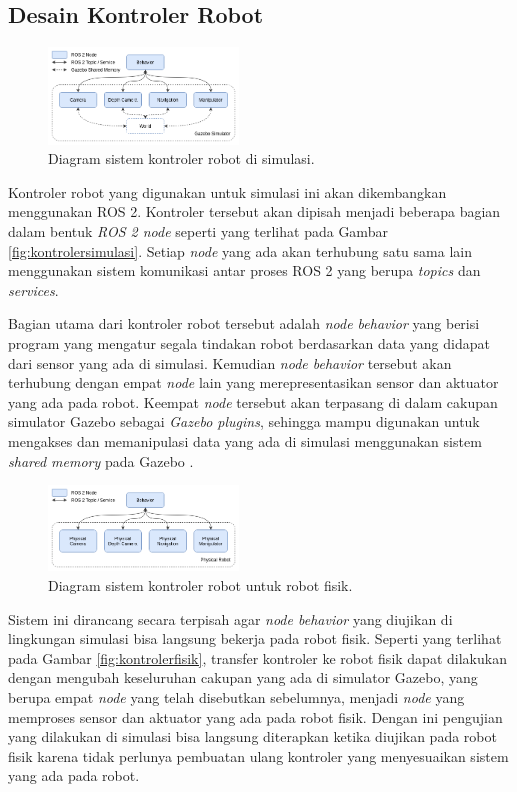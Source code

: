 \subsection{Desain Kontroler Robot}
\label{subsec:controllerdesign}

\begin{figure} [ht]
  \centering
  \includegraphics[width=0.45\textwidth]{images/simulation-controller.png}
  \caption{Diagram sistem kontroler robot di simulasi.}
  \label{fig:simulationcontroller}
\end{figure}

Kontroler robot yang digunakan untuk simulasi ini akan dikembangkan menggunakan ROS 2.
Kontroler tersebut akan dipisah menjadi beberapa bagian dalam bentuk \emph{ROS 2 node} seperti yang terlihat pada Gambar \ref{fig:kontrolersimulasi}.
Setiap \emph{node} yang ada akan terhubung satu sama lain menggunakan sistem komunikasi antar proses ROS 2 yang berupa \emph{topics} dan \emph{services}.

Bagian utama dari kontroler robot tersebut adalah \emph{node behavior} yang berisi program yang mengatur segala tindakan robot berdasarkan data yang didapat dari sensor yang ada di simulasi.
Kemudian \emph{node behavior} tersebut akan terhubung dengan empat \emph{node} lain yang merepresentasikan sensor dan aktuator yang ada pada robot.
Keempat \emph{node} tersebut akan terpasang di dalam cakupan simulator Gazebo sebagai \emph{Gazebo plugins},
  sehingga mampu digunakan untuk mengakses dan memanipulasi data yang ada di simulasi menggunakan sistem \emph{shared memory} pada Gazebo \citep{gazeboplugins}.

\begin{figure} [ht] \centering
  \includegraphics[width=0.45\textwidth]{images/real-robot-controller.png}
  \caption{Diagram sistem kontroler robot untuk robot fisik.}
  \label{fig:realrobotcontroller}
\end{figure}

Sistem ini dirancang secara terpisah agar \emph{node behavior} yang diujikan di lingkungan simulasi bisa langsung bekerja pada robot fisik.
Seperti yang terlihat pada Gambar \ref{fig:kontrolerfisik},
  transfer kontroler ke robot fisik dapat dilakukan dengan mengubah keseluruhan cakupan yang ada di simulator Gazebo,
  yang berupa empat \emph{node} yang telah disebutkan sebelumnya,
  menjadi \emph{node} yang memproses sensor dan aktuator yang ada pada robot fisik.
Dengan ini pengujian yang dilakukan di simulasi bisa langsung diterapkan ketika diujikan pada robot fisik karena tidak perlunya pembuatan ulang kontroler yang menyesuaikan sistem yang ada pada robot.
